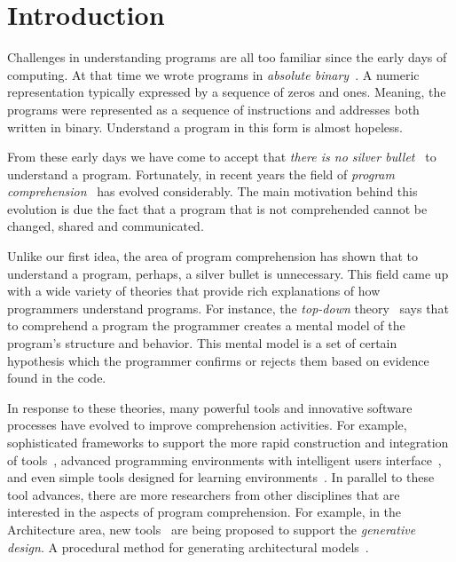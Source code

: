 
% 
% 

\section{Introduction}

Challenges in understanding programs are all too familiar since the early days of computing. At that time we wrote programs in \textit{absolute binary}~\cite{hamming2003art}. A numeric representation typically expressed by a sequence of zeros and ones. Meaning, the programs were represented as a sequence of instructions and addresses both written in binary. Understand a program in this form is almost hopeless.

From these early days we have come to accept that \textit{there is no silver bullet}~\cite{bullet1987essence} to understand a program. Fortunately, in recent years the field of \textit{program comprehension}~\cite{rugaber1995program} has evolved considerably. The main motivation behind this evolution is due the fact that a program that is not comprehended cannot be changed, shared and communicated. 

Unlike our first idea, the area of program comprehension has shown that to understand a program, perhaps, a silver bullet is unnecessary. This field came up with a wide variety of theories that provide rich explanations of how programmers understand programs. For instance, the \textit{top-down} theory~\cite{brooks1977towards} says that to comprehend a program the programmer creates a mental model of the program's structure and behavior. This mental model is a set of certain hypothesis which the programmer confirms or rejects them based on evidence found in the code.

In response to these theories, many powerful tools and innovative software processes have evolved to improve comprehension activities. For example, sophisticated frameworks to support the more rapid construction and integration of tools~\cite{DesRivieres2004}, advanced programming environments with intelligent users interface~\cite{carlson2005eclipse,boudreau2002netbeans,intellij2001intellij,guckenheimer2006software}, and even simple tools designed for learning environments~\cite{papert1980mindstorms,Kay1993,Reas2006,findler2002drscheme,GuoSIGCSE2013,mcdirmid2013usable}. In parallel to these tool advances, there are more researchers from other disciplines that are interested in the aspects of program comprehension. For example, in the Architecture area, new tools~\cite{aish2012designscript,lopes2011portable} are being proposed to support the \textit{generative design}. A procedural method for generating architectural models~\cite{mccormack2004generative}.

